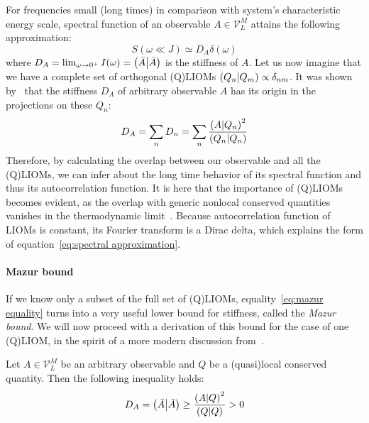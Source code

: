 For frequencies small (long times) in comparison with system's characteristic energy
scale, spectral function of an observable \(A \in \mathcal{V}_L^M\) attains the following approximation:
\begin{equation}
  S(\omega \ll  J) \simeq  D_{A} \delta(\omega)
  \label{eq:spectral approximation}
\end{equation}
where \(D_A = \lim_{\omega\to 0^+} I(\omega) = \left(\bar{A} \middle| \bar{A}\right)\) is the stiffness of \(A\).
Let us now imagine that we have a complete set of orthogonal (Q)LIOMs 
\(\left(Q_{n} \middle| Q_{m}\right) \propto \delta_{nm}\). It was shown 
by~\textcite{Mazur1969,Suzuki1971} that the stiffness \(D_{A}\) of arbitrary observable \(A\) has its origin
in the projections on these \(Q_{n}\):
\begin{equation}
  D_A = \sum_{n} D_{n} = \sum_{n} \frac{\left(A \middle| Q_{n}\right)^2}
  {\left(Q_{n} \middle| Q_{n}\right)}
  \label{eq:mazur equality}
\end{equation}
Therefore, by calculating the overlap between our observable and all the (Q)LIOMs, we can infer about the long time
behavior of its spectral function and thus its autocorrelation function. It is here that the
importance of (Q)LIOMs becomes evident, as the overlap with generic nonlocal conserved quantities
vanishes in the thermodynamic limit~\autocite{Zotos1997}.
Because autocorrelation function of
LIOMs is constant, its Fourier transform is a Dirac delta, which explains the form of 
equation~\eqref{eq:spectral approximation}. 

\paragraph{Mazur bound} If we know only a subset of the full set of (Q)LIOMs, 
equality~\eqref{eq:mazur equality} turns into 
a very useful lower bound for stiffness, called the \textit{Mazur bound}. We will now proceed with a derivation
of this bound for the case of one (Q)LIOM, in the spirit of a more modern discussion from~\textcite{Ilievski2016a}.
\begin{proposition}
  Let \(A\in \mathcal{V}_L^M\) be an arbitrary observable and \(Q\) be a (quasi)local conserved quantity. Then the following inequality
  holds:
  \begin{equation*}
    D_{A} = \left(\bar{A} \middle| \bar{A}\right) \geq \frac{\left(A \middle| Q\right)^2}{\left(Q \middle| Q\right)} > 0
  \end{equation*}
  \label{prop:single mazur}
\end{proposition}


